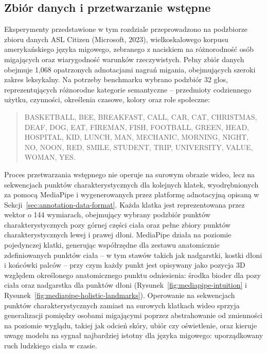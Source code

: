 \subsection{Zbiór danych i przetwarzanie wstępne}
\label{sec:gloss-recognition-dataset}

Eksperymenty przedstawione w tym rozdziale przeprowadzono na podzbiorze zbioru
danych ASL Citizen (Microsoft, 2023), wielkoskalowego korpusu amerykańskiego
języka migowego, zebranego z naciskiem na różnorodność osób migających oraz
wiarygodność warunków rzeczywistych. Pełny zbiór danych obejmuje 1{,}068
opatrzonych adnotacjami nagrań migania, obejmujących szeroki zakres leksykalny.
Na potrzeby benchmarku wybrano podzbiór 32 glos, reprezentujących różnorodne
kategorie semantyczne -- przedmioty codziennego użytku, czynności, określenia
czasowe, kolory oraz role społeczne:

\begin{quote}
\small
BASKETBALL, BEE, BREAKFAST, CALL, CAR, CAT, CHRISTMAS, DEAF, DOG, EAT, FIREMAN,
FISH, FOOTBALL, GREEN, HEAD, HOSPITAL, KID, LUNCH, MAN, MECHANIC, MORNING,
NIGHT, NO, NOON, RED, SMILE, STUDENT, TRIP, UNIVERSITY, VALUE, WOMAN, YES.
\end{quote}

\label{sec:gloss-recognition-preprocessing}
Proces przetwarzania wstępnego nie operuje na surowym obrazie wideo, lecz na
sekwencjach punktów charakterystycznych dla kolejnych klatek, wyodrębnionych za
pomocą MediaPipe i wygenerowanych przez platformę adnotacyjną opisaną w
Sekcji~\ref{sec:annotation-data-format}. Każda klatka jest reprezentowana przez
wektor o 144 wymiarach, obejmujący wybrany podzbiór punktów charakterystycznych
pozy górnej części ciała oraz pełne zbiory punktów charakterystycznych lewej i
prawej dłoni. MediaPipe działa na poziomie pojedynczej klatki, generując
współrzędne dla zestawu anatomicznie zdefiniowanych punktów ciała -- w tym
stawów takich jak nadgarstki, kostki dłoni i końcówki palców -- przy czym każdy
punkt jest opisywany jako pozycja 3D względem określonego anatomicznego punktu
odniesienia: środka bioder dla pozy ciała oraz nadgarstka dla punktów dłoni
(Rysunek~\ref{fig:mediapipe-intuition} i
Rysunek~\ref{fig:mediapipe-holistic-landmarks}). Operowanie na sekwencjach
punktów charakterystycznych zamiast na surowych klatkach wideo sprzyja
generalizacji pomiędzy osobami migającymi poprzez abstrahowanie od zmienności
na poziomie wyglądu, takiej jak odcień skóry, ubiór czy oświetlenie, oraz kieruje
uwagę modelu na sygnał najbardziej istotny dla języka migowego: uporządkowany
ruch ludzkiego ciała w czasie.

